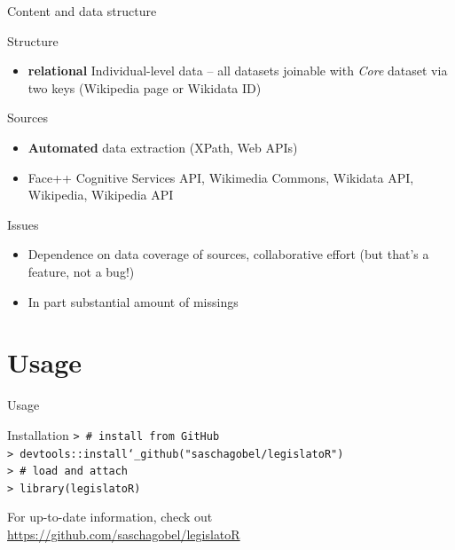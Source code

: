 \begin{frame}{Content and data structure}
\begin{block}{Structure}
\begin{itemize}
	\item \textbf{relational} Individual-level data -- all datasets joinable with \textit{Core} dataset via two keys  (Wikipedia page or Wikidata ID)
\end{itemize}
\end{block}
\pause
\begin{block}{Sources}
\begin{itemize}
	\item \textbf{Automated} data extraction (XPath, Web APIs)
	\item Face++ Cognitive Services API, Wikimedia Commons, Wikidata API, Wikipedia, Wikipedia API
\end{itemize}
\end{block}
\pause
\begin{block}{Issues}
\begin{itemize}
	\item Dependence on data coverage of sources, collaborative effort (but that's a feature, not a bug!)
	\item In part substantial amount of missings
\end{itemize}
\end{block}
\end{frame}

\section{Usage}


\begin{frame}{Usage}
\begin{block}{Installation}
\scriptsize{\texttt{> \# install from GitHub}} \\
\scriptsize{\texttt{> devtools::install\char`_github("saschagobel/legislatoR")}} \\
\scriptsize{\texttt{> \# load and attach}} \\
\scriptsize{\texttt{> library(legislatoR)}}
\end{block}
\vspace{1cm}
\pause
\Large \centering For up-to-date information, check out \\ \url{https://github.com/saschagobel/legislatoR}
\end{frame}


